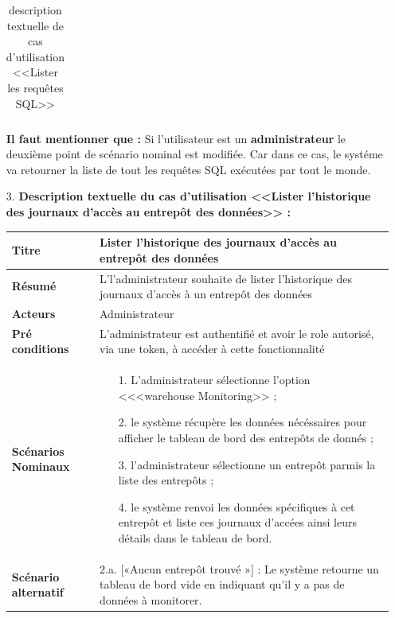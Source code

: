 \begin{enumerate}
\begin{table}[H]
\begin{tabular}{|p{3.5cm}|p{12cm}|}
                \hline 
            \end{tabular}
        \caption{description textuelle de cas d'utilisation <<Lister les requêtes SQL>>}
        \end{table}
        \par \textbf{Il faut mentionner que  : } Si l'utilisateur est un \textbf{administrateur} le deuxième point de scénario nominal est modifiée. 
        Car dans ce cas, le systéme va retourner la liste de tout les requêtes SQL exécutées par tout le monde.
\newpage
\vspace{2cm}
        \item[3.] \textbf{Description textuelle du cas d'utilisation <<Lister l'historique des journaux d'accès au entrepôt des données>> :}
    \begin{table}[H]
        \centering
        \begin{tabular}{|p{3.5cm}|p{12cm}|}
            \hline \textbf{Titre} &  Lister l'historique des journaux d'accès au entrepôt des données\\
            \hline \textbf{Résumé} & L'l'administrateur souhaite de lister l'historique des journaux d'accès à un entrepôt des données \\
            \hline \textbf{Acteurs} & Administrateur \\
            \hline \textbf{Pré conditions }& L'administrateur est authentifié et avoir le role autorisé, via une token, à accéder à cette fonctionnalité\\
            \hline \textbf{Scénarios Nominaux} &
                \begin{enumerate}
                    \item [1.] L'administrateur sélectionne l'option <<<warehouse Monitoring>> ;
                    \item [2.] le système récupère les données nécéssaires pour afficher le tableau de bord des entrepôts de donnés  ;
                    \item [3.] l'administrateur sélectionne un entrepôt parmis la liste des entrepôts ;
                    \item [4.] le système renvoi les données spécifiques à cet entrepôt et liste ces journaux d'accées ainsi leurs détails dans le tableau de bord.      
                \end{enumerate}\\
                    \hline \textbf{Scénario alternatif} & 
                    2.a. \hspace{0.3cm} [«Aucun entrepôt trouvé »] : Le système retourne un tableau de bord vide en indiquant qu'il y a pas de données à monitorer.\\

\end{tabular}
\end{table}
\end{enumerate}
